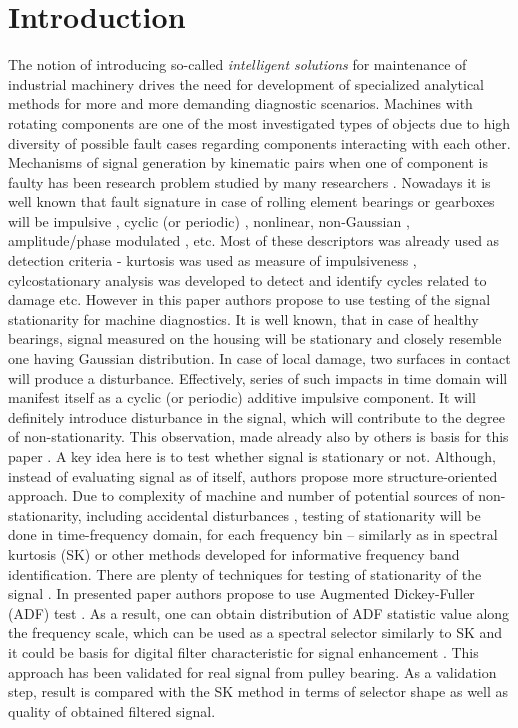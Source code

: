 \documentclass[11pt]{article}
\begin{document}
\section{Introduction}
The notion of introducing so-called \emph{intelligent solutions} for maintenance of industrial machinery drives the need for development of specialized analytical methods for more and more demanding diagnostic scenarios. Machines with rotating components are one of the most investigated types of objects due to high diversity of possible fault cases regarding components interacting with each other. Mechanisms of signal generation by kinematic pairs when one of component is faulty has been research problem studied by many researchers \cite{randall1982new,chaari2008effect,antoni2002differential,antoni2003stochastic}. Nowadays it is well known that fault signature in case of rolling element bearings or gearboxes will be impulsive \cite{antoni2006spectral}, cyclic (or periodic) \cite{michalak2017application}, nonlinear, non-Gaussian \cite{wylomanska2016application}, amplitude/phase modulated \cite{chaari2012gearbox}, etc. Most of these descriptors was already used as detection criteria - kurtosis was used as measure of impulsiveness \cite{wodecki2018optimal}, cylcostationary analysis was developed to detect and identify cycles related to damage \cite{wodecki2017informative, kruczek2017multiple} etc. However in this paper authors propose to use testing of the signal stationarity for machine diagnostics. It is well known, that in case of healthy bearings, signal measured on the housing will be stationary and closely resemble one having Gaussian distribution. In case of local damage, two surfaces in contact will produce a disturbance. Effectively, series of such impacts in time domain will manifest itself as a cyclic (or periodic) additive impulsive component. It will definitely introduce disturbance in the signal, which will contribute to the degree of non-stationarity. This observation, made already also by others is basis for this paper \cite{martin2007advanced}. A key idea here is to test whether signal is stationary or not. Although, instead of evaluating signal as of itself, authors propose more structure-oriented approach. Due to complexity of machine and number of potential sources of non-stationarity, including accidental disturbances \cite{wodecki2017local,zak2017measures}, testing of stationarity will be done in time-frequency domain, for each frequency bin -- similarly as in spectral kurtosis (SK) or other methods developed for informative frequency band identification. There are plenty of techniques for testing of stationarity of the signal \cite{dickey1979distribution,durbin1951testing,kwiatkowski1992testing}. In presented paper authors propose to use Augmented Dickey-Fuller (ADF) test \cite{dickey1979distribution}. As a result, one can obtain distribution of ADF statistic value along the frequency scale, which can be used as a spectral selector similarly to SK and it could be basis for digital filter characteristic for signal enhancement \cite{obuchowski2014selection}. This approach has been validated for real signal from pulley bearing. As a validation step, result is compared with the SK method in terms of selector shape as well as quality of obtained filtered signal.
\end{document}
